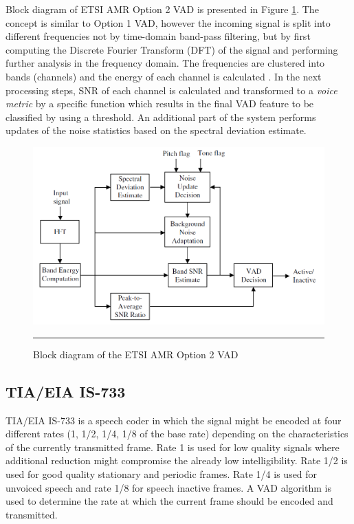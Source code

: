 Block diagram of ETSI AMR Option 2 VAD is presented in Figure \ref{fig:AMR2}. The concept is similar to Option 1 VAD, however the incoming signal is split into different frequencies not by time-domain band-pass filtering, but by first computing the Discrete Fourier Transform (DFT) of the signal and performing further analysis in the frequency domain. The frequencies are clustered into bands (channels) and the energy of each channel is calculated \citep{Cornu}. In the next processing steps, SNR of each channel is calculated and transformed to a \emph{voice metric} by a specific function which results in the final VAD feature to be classified by using a threshold. An additional part of the system performs updates of the noise statistics based on the spectral deviation estimate.

\begin{figure}[htbp]
	\centering
		\includegraphics[width=0.9\columnwidth]{Figures/AMR2.png}
		\rule{37em}{0.5pt}
	\caption[Block diagram of the ETSI AMR Option 2 VAD]{Block diagram of the ETSI AMR Option 2 VAD \cite{Kondoz}}
	\label{fig:AMR2}
\end{figure}

\subsection{TIA/EIA IS-733}

TIA/EIA IS-733 is a speech coder in which the signal might be encoded at four different rates (1, 1/2, 1/4, 1/8 of the base rate) depending on the characteristics of the currently transmitted frame. Rate 1 is used for low quality signals where additional reduction might compromise the already low intelligibility. Rate 1/2 is used for good quality stationary and periodic frames. Rate 1/4 is used for unvoiced speech and rate 1/8 for speech inactive frames. A VAD algorithm is used to determine the rate at which the current frame should be encoded and transmitted.

